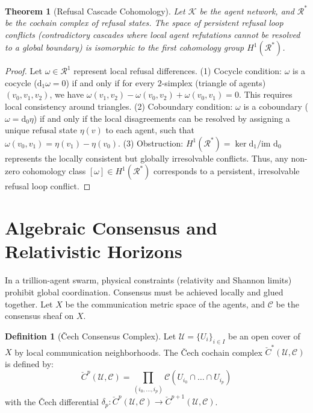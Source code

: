 \documentclass[11pt,oneside]{book}
\theoremstyle{definition}
\newtheorem{definition}{Definition}[chapter]
\theoremstyle{plain}
\newtheorem{theorem}{Theorem}[chapter]
\theoremstyle{remark}
\begin{document}
\begin{theorem}[Refusal Cascade Cohomology]\label{thm:cascade_cohomology}
Let $\mathcal{K}$ be the agent network, and $\mathcal{R}^*$ be the cochain complex of refusal states. %
The space of persistent refusal loop conflicts (contradictory cascades where local agent refutations cannot be resolved to a global boundary) is isomorphic to the first cohomology group $H^1(\mathcal{R}^*)$. %
\end{theorem}

\begin{proof}
Let $\omega \in \mathcal{R}^1$ represent local refusal differences. %
(1) Cocycle condition: $\omega$ is a cocycle ($\mathrm{d}_1 \omega = 0$) if and only if for every $2$-simplex (triangle of agents) $(v_0, v_1, v_2)$, we have $\omega(v_1, v_2) - \omega(v_0, v_2) + \omega(v_0, v_1) = 0$. %
This requires local consistency around triangles. %
(2) Coboundary condition: $\omega$ is a coboundary ($\omega = \mathrm{d}_0 \eta$) if and only if the local disagreements can be resolved by assigning a unique refusal state $\eta(v)$ to each agent, such that $\omega(v_0, v_1) = \eta(v_1) - \eta(v_0)$. %
(3) Obstruction: $H^1(\mathcal{R}^*) = \ker \mathrm{d}_1 / \text{im } \mathrm{d}_0$ represents the locally consistent but globally irresolvable conflicts. %
Thus, any non-zero cohomology class $[\omega] \in H^1(\mathcal{R}^*)$ corresponds to a persistent, irresolvable refusal loop conflict. %
\end{proof}

\section{Algebraic Consensus and Relativistic Horizons}
In a trillion-agent swarm, physical constraints (relativity and Shannon limits) prohibit global coordination. %
Consensus must be achieved locally and glued together. %
Let $X$ be the communication metric space of the agents, and $\mathcal{C}$ be the consensus sheaf on $X$. %

\begin{definition}[Čech Consensus Complex]\label{def:cech_consensus}
Let $\mathcal{U} = \{U_i\}_{i \in I}$ be an open cover of $X$ by local communication neighborhoods. %
The Čech cochain complex $\check{C}^*(\mathcal{U}, \mathcal{C})$ is defined by:
\[
\check{C}^p(\mathcal{U}, \mathcal{C}) = \prod_{(i_0, \dots, i_p)} \mathcal{C}(U_{i_0} \cap \dots \cap U_{i_p})
\]
with the Čech differential $\delta_p: \check{C}^p(\mathcal{U}, \mathcal{C}) \to \check{C}^{p+1}(\mathcal{U}, \mathcal{C})$. %
\end{definition}
\end{document}

